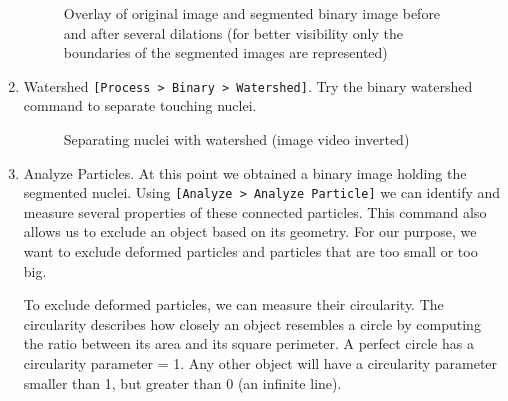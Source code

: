 \documentclass[11pt,a4paper,oneside]{report}
\newcommand{\ijmenu}[1]{\texttt{\small#1}}
\begin{document}
\begin{enumerate}
\begin{figure}[htbp]
         \caption{Overlay of original image and segmented binary image before and after several dilations (for better visibility only the boundaries of the segmented images are represented)}

         \label{fig:NucOverlayDilate}
    \end{figure}


    \item Watershed
    \ijmenu{[Process >  Binary > Watershed]}.
    Try the binary watershed command to separate touching nuclei.
    
    \begin{figure}[htbp]
        \centering
        \quad
         \quad
         \caption{Separating nuclei with watershed (image video inverted)}
         \label{fig:NucWatershed}
    \end{figure}

    \item Analyze Particles.
    At this point we obtained a binary image holding the segmented nuclei.
    Using \ijmenu{[Analyze > Analyze Particle]} we can identify and measure several properties of these connected particles. This command also allows us to exclude an object based on its geometry. For our purpose,  we want to exclude deformed particles and particles that are too small or too big.
    
    To exclude deformed particles, we can measure their circularity. The circularity describes how closely an object resembles a circle by computing the ratio between its area and its square perimeter. A perfect circle has a circularity parameter = 1. Any other object will have a circularity parameter smaller than 1, but greater than 0 (an infinite line). 
    

\end{enumerate}
\end{document}
